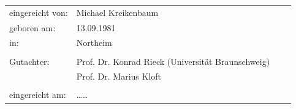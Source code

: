 \documentclass[a4paper,10pt]{article}
\begin{document}
{\large
  \begin{tabular}{llll}
    eingereicht von:    & Michael Kreikenbaum && \\ %
    geboren am:         & 13.09.1981 && \\
    in:                 & Northeim && \\
    &&&\\
    Gutachter:          & Prof. Dr. Konrad Rieck (Universität Braunschweig) && \\
		        & Prof. Dr. Marius Kloft && \\%
    &&&\\
    eingereicht am:     & \dots\dots \\ %
  \end{tabular}
}
\end{document}
